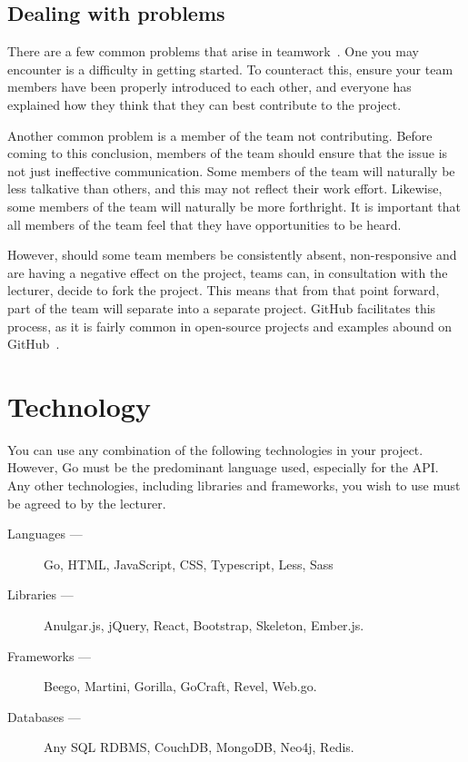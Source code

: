 \subsection*{Dealing with problems}
There are a few common problems that arise in teamwork~\cite{teamworkproblems}.
One you may encounter is a difficulty in getting started.
To counteract this, ensure your team members have been properly introduced to each other, and everyone has explained how they think that they can best contribute to the project.

Another common problem is a member of the team not contributing.
Before coming to this conclusion, members of the team should ensure that the issue is not just ineffective communication.
Some members of the team will naturally be less talkative than others, and this may not reflect their work effort.
Likewise, some members of the team will naturally be more forthright.
It is important that all members of the team feel that they have opportunities to be heard.

However, should some team members be consistently absent, non-responsive and are having a negative effect on the project, teams can, in consultation with the lecturer, decide to fork the project.
This means that from that point forward, part of the team will separate into a separate project.
GitHub facilitates this process, as it is fairly common in open-source projects and examples abound on GitHub~\cite{githubforking}.

\section*{Technology}
You can use any combination of the following technologies in your project.
However, Go must be the predominant language used, especially for the API.
Any other technologies, including libraries and frameworks, you wish to use must be agreed to by the lecturer.

\begin{description}
\item[Languages ---] Go, HTML, JavaScript, CSS, Typescript, Less, Sass
\item[Libraries ---] Anulgar.js, jQuery, React, Bootstrap, Skeleton, Ember.js.
\item[Frameworks ---] Beego, Martini, Gorilla, GoCraft, Revel, Web.go.
\item[Databases ---] Any SQL RDBMS, CouchDB, MongoDB, Neo4j, Redis.
\end{description}


